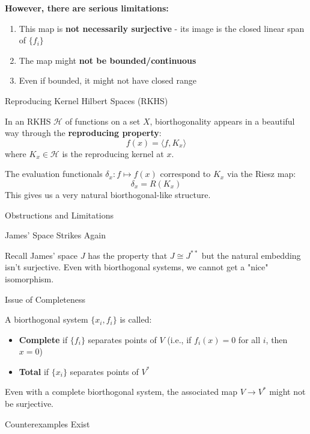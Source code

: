 \documentclass[aps,preprint]{revtex4}
\newenvironment{answer}
  {\begin{tcolorbox}[colback=green!5!white,colframe=green!75!black,title=Answer]}
  {\end{tcolorbox}}
\begin{document}
\begin{answer}
\textbf{However, there are serious limitations:}

\begin{enumerate}
\item This map is \textbf{not necessarily surjective} - its image is the
closed linear span of $\{f_i\}$

\item The map might \textbf{not be bounded/continuous}

\item Even if bounded, it might not have closed range
\end{enumerate}

Reproducing Kernel Hilbert Spaces (RKHS)

In an RKHS $\mathcal{H}$ of functions on a set $X$, biorthogonality appears
in a beautiful way through the \textbf{reproducing property}: 
\begin{equation*}
f(x) = \langle f, K_x \rangle
\end{equation*}
where $K_x \in \mathcal{H}$ is the reproducing kernel at $x$.

The evaluation functionals $\delta_x: f \mapsto f(x)$ correspond to $K_x$
via the Riesz map: 
\begin{equation*}
\delta_x = R(K_x)
\end{equation*}
This gives us a very natural biorthogonal-like structure.

Obstructions and Limitations

James' Space Strikes Again

Recall James' space $J$ has the property that $J \cong J^{**}$ but the
natural embedding isn't surjective. Even with biorthogonal systems, we
cannot get a "nice" isomorphism.

Issue of Completeness

A biorthogonal system $\{x_i, f_i\}$ is called:

\begin{itemize}
\item \textbf{Complete} if $\{f_i\}$ separates points of $V$ (i.e., if $%
f_i(x) = 0$ for all $i$, then $x = 0$)

\item \textbf{Total} if $\{x_i\}$ separates points of $V^*$
\end{itemize}

Even with a complete biorthogonal system, the associated map $V \to V^*$
might not be surjective.

Counterexamples Exist


\end{answer}
\end{document}
